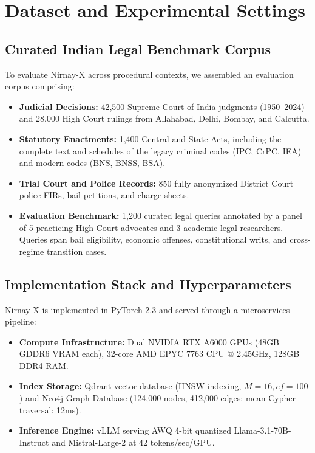 \documentclass[conference]{IEEEtran}
\begin{document}
\section{Dataset and Experimental Settings}

\subsection{Curated Indian Legal Benchmark Corpus}
To evaluate Nirnay-X across procedural contexts, we assembled an evaluation corpus comprising:
\begin{itemize}
    \item \textbf{Judicial Decisions:} 42,500 Supreme Court of India judgments (1950--2024) and 28,000 High Court rulings from Allahabad, Delhi, Bombay, and Calcutta.
    \item \textbf{Statutory Enactments:} 1,400 Central and State Acts, including the complete text and schedules of the legacy criminal codes (IPC, CrPC, IEA) and modern codes (BNS, BNSS, BSA).
    \item \textbf{Trial Court and Police Records:} 850 fully anonymized District Court police FIRs, bail petitions, and charge-sheets.
    \item \textbf{Evaluation Benchmark:} 1,200 curated legal queries annotated by a panel of 5 practicing High Court advocates and 3 academic legal researchers. Queries span bail eligibility, economic offenses, constitutional writs, and cross-regime transition cases.
\end{itemize}

\subsection{Implementation Stack and Hyperparameters}
Nirnay-X is implemented in PyTorch 2.3 and served through a microservices pipeline:
\begin{itemize}
    \item \textbf{Compute Infrastructure:} Dual NVIDIA RTX A6000 GPUs (48GB GDDR6 VRAM each), 32-core AMD EPYC 7763 CPU @ 2.45GHz, 128GB DDR4 RAM.
    \item \textbf{Index Storage:} Qdrant vector database (HNSW indexing, $M=16, ef=100$) and Neo4j Graph Database (124,000 nodes, 412,000 edges; mean Cypher traversal: 12ms).
    \item \textbf{Inference Engine:} vLLM serving AWQ 4-bit quantized Llama-3.1-70B-Instruct and Mistral-Large-2 at 42 tokens/sec/GPU.
\end{itemize}
\end{document}
